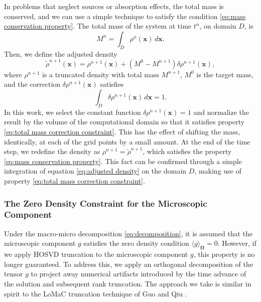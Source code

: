 \documentclass[onefignum,onetabnum]{siamart220329}
\begin{document}
In problems that neglect sources or absorption effects, the total mass is conserved, and we can use a simple technique to satisfy the condition \eqref{eq:mass conservation property}. The total mass of the system at time $t^{n}$, on domain $D$, is
\begin{equation}
    \label{eq:total mass at t^n}
    M^{n} = \int_{D} \rho^{n}(\mathbf{x}) \, d\mathbf{x}.
\end{equation}
Then, we define the adjusted density
\begin{equation}
    \label{eq:adjusted density}
    \widetilde{\rho}^{n+1}(\mathbf{x}) = \rho^{n+1}(\mathbf{x}) + \left(M^{0} - M^{n+1} \right) \delta \rho^{n+1} (\mathbf{x}),
\end{equation}
where $\rho^{n+1}$ is a truncated density with total mass $M^{n+1}$, $M^{0}$ is the target mass, and the correction $\delta \rho^{n+1} (\mathbf{x})$ satisfies
\begin{equation}
    \label{eq:total mass correction constraint}
    \int_{D} \delta \rho^{n+1} (\mathbf{x}) \, d\mathbf{x} = 1.
\end{equation}
In this work, we select the constant function $\delta \rho^{n+1} (\mathbf{x}) = 1$ and normalize the result by the volume of the computational domain so that it satisfies property \eqref{eq:total mass correction constraint}. This has the effect of shifting the mass, identically, at each of the grid points by a small amount. At the end of the time step, we redefine the density as $\rho^{n+1} = \widetilde{\rho}^{n+1}$, which satisfies the property \eqref{eq:mass conservation property}. This fact can be confirmed through a simple integration of equation \eqref{eq:adjusted density} on the domain $D$, making use of property \eqref{eq:total mass correction constraint}.




\subsubsection{The Zero Density Constraint for the Microscopic Component}
\label{subsubsec:projection for g}

Under the macro-micro decomposition \eqref{eq:decomposition}, it is assumed that the microscopic component $g$ satisfies the zero density condition $\langle g \rangle_{\mathbf{\Omega}} = 0$. However, if we apply HOSVD truncation to the microscopic component $g$, this property is no longer guaranteed. To address this, we apply an orthogonal decomposition of the tensor $g$ to project away numerical artifacts introduced by the time advance of the solution and subsequent rank truncation. The approach we take is similar in spirit to the LoMaC truncation technique of Guo and Qiu \cite{GuoVlasovDLRVlasovDynamics,GuoVlasovLoMacDG2023}. 
\end{document}
